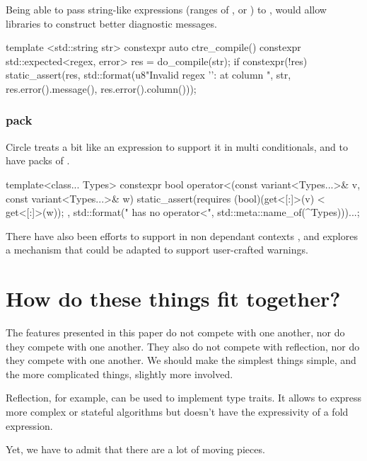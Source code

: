 \documentclass{wg21}
\begin{document}
Being able to pass string-like expressions (ranges of , or ) to ,
would allow libraries to construct better diagnostic messages.

\begin{colorblock}
template <std::string str>
constexpr auto ctre_compile() {
   constexpr std::expected<regex, error> res = do_compile(str);
   if constexpr(!res) {
       static_assert(res, std::format(u8"Invalid regex '{}': {} at column {}",
                                      str, res.error().message(), res.error().column()));
   }
}
\end{colorblock}

\subsubsection{ pack}

Circle treats  a bit like an expression to support it in multi conditionals, and to have packs of .

\begin{colorblock}
template<class... Types>
constexpr bool operator<(const variant<Types...>& v,  const variant<Types...>& w) {
    static_assert(requires{ (bool)(get<[:]>(v) < get<[:]>(w)); },
        std::format("{} has no operator<", std::meta::name_of(^Types)))...;
}
\end{colorblock}

There have also been efforts to support  in non dependant contexts ,
and  explores a mechanism that could be adapted to support user-crafted warnings.

\section{How do these things fit together?}

The features presented in this paper do not compete with one another, nor do they compete with one another.
They also do not compete with reflection, nor do they compete with one another.
We should make the simplest things simple, and the more complicated things, slightly more involved.

Reflection, for example, can be used to implement type traits. It allows to express more complex or stateful algorithms but doesn't have the expressivity of a fold expression.

Yet, we have to admit that there are a lot of moving pieces.
\end{document}
